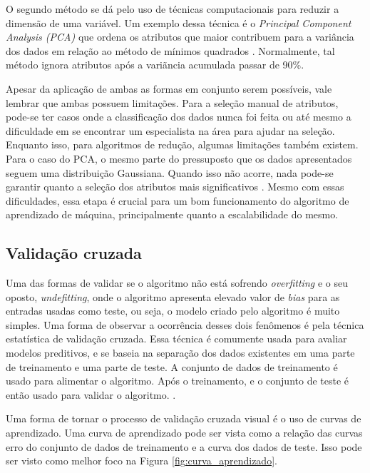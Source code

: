 O segundo método se dá pelo uso de técnicas computacionais para reduzir a
dimensão de uma variável. Um exemplo dessa técnica é o \textit{Principal
Component Analysis (PCA) } que ordena os atributos que maior contribuem para a
variância dos dados em relação ao método de mínimos quadrados
\cite{amatriain2011data}. Normalmente, tal método ignora atributos após a
variãncia acumulada passar de 90\%.

Apesar da aplicação de ambas as formas em conjunto serem possíveis, vale lembrar
que ambas possuem limitações. Para a seleção manual de atributos, pode-se ter
casos onde a classificação dos dados nunca foi feita ou até mesmo a dificuldade
em se encontrar um especialista na área para ajudar na seleção. Enquanto isso,
para algoritmos de redução, algumas limitações também existem. Para o caso do
PCA, o mesmo parte do pressuposto que os dados apresentados seguem uma
distribuição Gaussiana. Quando isso não acorre, nada pode-se garantir quanto a
seleção dos atributos mais significativos \cite{amatriain2011data}. Mesmo com
essas dificuldades, essa etapa é crucial para um bom funcionamento do algoritmo
de aprendizado de máquina, principalmente quanto a escalabilidade do mesmo.


\subsection{Validação cruzada}

Uma das formas de validar se o algoritmo não está sofrendo \textit{overfitting}
e o seu oposto, \textit{undefitting}, onde o algoritmo apresenta elevado valor
de \textit{bias} para as entradas usadas como teste, ou seja, o modelo criado
pelo algoritmo é muito simples. Uma forma de observar a ocorrência desses dois
fenômenos é pela técnica estatística de validação cruzada. Essa técnica é
comumente usada para avaliar modelos preditivos, e se baseia na separação dos
dados existentes em uma parte de treinamento e uma parte de teste. A conjunto de
dados de treinamento é usado para alimentar o algoritmo. Após o treinamento,
e o conjunto de teste é então usado para validar o algoritmo. \cite{araujo2011apprecommender}.

Uma forma de tornar o processo de validação cruzada visual é o uso de curvas de
aprendizado. Uma curva de aprendizado pode ser vista como a relação das curvas
erro do conjunto de dados de treinamento e a curva dos dados de teste. Isso pode
ser visto como melhor foco na Figura \ref{fig:curva_aprendizado}.

